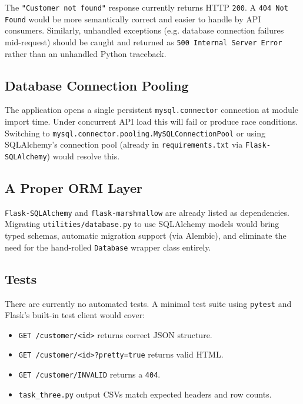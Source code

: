 \documentclass[12pt,a4paper]{article}
\begin{document}
The \texttt{"Customer not found"} response currently returns HTTP \texttt{200}.
A \texttt{404 Not Found} would be more semantically correct and easier to
handle by API consumers. Similarly, unhandled exceptions (e.g. database
connection failures mid-request) should be caught and returned as
\texttt{500 Internal Server Error} rather than an unhandled Python traceback.

\subsection{Database Connection Pooling}

The application opens a single persistent \texttt{mysql.connector} connection
at module import time. Under concurrent API load this will fail or produce race
conditions. Switching to \texttt{mysql.connector.pooling.MySQLConnectionPool}
or using SQLAlchemy's connection pool (already in \texttt{requirements.txt} via
\texttt{Flask-SQLAlchemy}) would resolve this.

\subsection{A Proper ORM Layer}

\texttt{Flask-SQLAlchemy} and \texttt{flask-marshmallow} are already listed as
dependencies. Migrating \texttt{utilities/database.py} to use SQLAlchemy models
would bring typed schemas, automatic migration support (via Alembic), and
eliminate the need for the hand-rolled \texttt{Database} wrapper class entirely.

\subsection{Tests}

There are currently no automated tests. A minimal test suite using
\texttt{pytest} and Flask's built-in test client would cover:

\begin{itemize}[leftmargin=2em]
    \item \texttt{GET /customer/<id>} returns correct JSON structure.
    \item \texttt{GET /customer/<id>?pretty=true} returns valid HTML.
    \item \texttt{GET /customer/INVALID} returns a \texttt{404}.
    \item \texttt{task\_three.py} output CSVs match expected headers and row counts.
\end{itemize}
\end{document}
